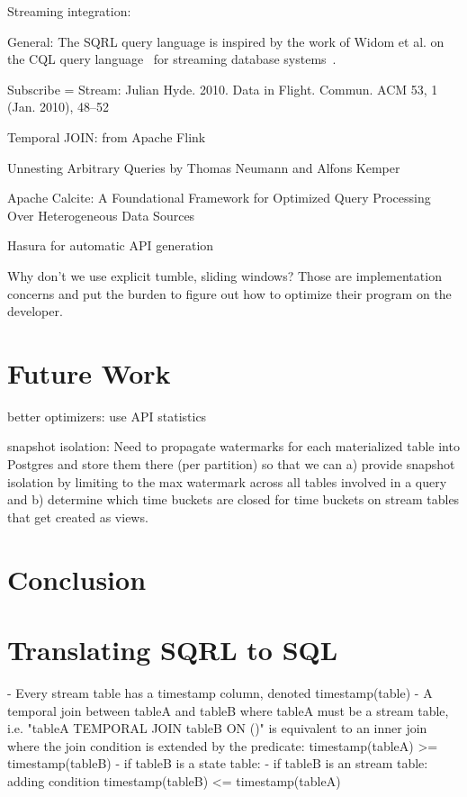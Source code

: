 \documentclass[	DIV=calc,%
							paper=letter,%
							fontsize=11pt,%
							twocolumn]{scrartcl}	 					%
\begin{document}
Streaming integration:

General: The SQRL query language is inspired by the work of Widom et al. on the CQL query language~\cite{arasu_cql_2006} for streaming database systems~\cite{arasu_stream_2016}.

Subscribe = Stream: Julian Hyde. 2010. Data in Flight. Commun. ACM 53, 1 (Jan. 2010), 48–52

Temporal JOIN: from Apache Flink

Unnesting Arbitrary Queries by Thomas Neumann and Alfons Kemper

Apache Calcite: A Foundational Framework for Optimized Query Processing Over Heterogeneous Data Sources

Hasura for automatic API generation

Why don't we use explicit tumble, sliding windows? Those are implementation concerns and put the burden to figure out how to optimize their program on the developer.

\section{Future Work}

better optimizers: use API statistics

snapshot isolation:
Need to propagate watermarks for each materialized table into Postgres and store them there (per partition) so that we can a) provide snapshot isolation by limiting to the max watermark across all tables involved in a query and b) determine which time buckets are closed for time buckets on stream tables that get created as views.

\section{Conclusion}
\label{sec:conclusion}



\appendix

\section{Translating SQRL to SQL}
\label{appendix:sqrl2sql}

- Every stream table has a timestamp column, denoted timestamp(table)
- A temporal join between tableA and tableB where tableA must be a stream table, i.e. "tableA TEMPORAL JOIN tableB ON ()" is equivalent to an inner join where the join condition is extended by the predicate:
    timestamp(tableA) >= timestamp(tableB)
    - if tableB is a state table:
    - if tableB is an stream table: adding condition timestamp(tableB) <= timestamp(tableA)
\end{document}
